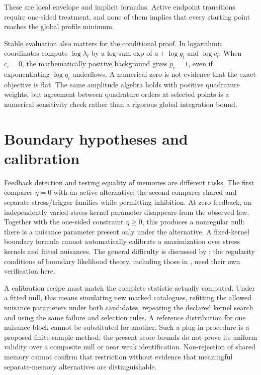 These are local envelope and implicit formulas. Active endpoint transitions require one-sided treatment, and none of them implies that every starting point reaches the global profile minimum.

Stable evaluation also matters for the conditional proof. In logarithmic coordinates compute \(\log\lambda_i\) by a log-sum-exp of \(a+\log q_i\) and \(\log c_i\). When \(c_i=0\), the mathematically positive background gives \(p_i=1\), even if exponentiating \(\log q_i\) underflows. A numerical zero is not evidence that the exact objective is flat. The same amplitude algebra holds with positive quadrature weights, but agreement between quadrature orders at selected points is a numerical sensitivity check rather than a rigorous global integration bound.

\section{Boundary hypotheses and calibration}
\label{sec:boundary_calibration}

Feedback detection and testing equality of memories are different tasks. The first compares \(\eta=0\) with an active alternative; the second compares shared and separate stress/trigger families while permitting inhibition. At zero feedback, an independently varied stress-kernel parameter disappears from the observed law. Together with the one-sided constraint \(\eta\ge0\), this produces a nonregular null: there is a nuisance parameter present only under the alternative. A fixed-kernel boundary formula cannot automatically calibrate a maximization over stress kernels and fitted nuisances. The general difficulty is discussed by \citet{Davies1977}; the regularity conditions of boundary likelihood theory, including those in \citet{SelfLiang1987}, need their own verification here.

A calibration recipe must match the complete statistic actually computed. Under a fitted null, this means simulating new marked catalogues, refitting the allowed nuisance parameters under both candidates, repeating the declared kernel search and using the same failure and selection rules. A reference distribution for one nuisance block cannot be substituted for another. Such a plug-in procedure is a proposed finite-sample method; the present score bounds do not prove its uniform validity over a composite null or near weak identification. Non-rejection of shared memory cannot confirm that restriction without evidence that meaningful separate-memory alternatives are distinguishable.

